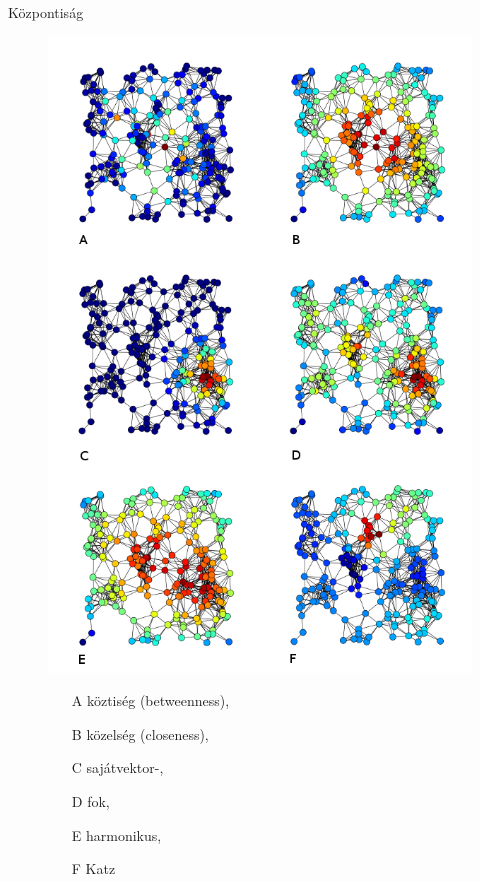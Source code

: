 \documentclass{beamer}
\newlength{\onecolwid}
\begin{document}
\begin{frame}[t]
\begin{columns}[t]
    \begin{column}{\onecolwid} %
      \begin{block}{Központiság}
        \begin{figure}
        \includegraphics{6_centrality_measures}
          \begin{itemize}
\item[A] köztiség (betweenness),
\item[B] közelség (closeness),
\item[C] sajátvektor-,
\item[D] fok,
\item[E] harmonikus,
\item[F] Katz
          \end{itemize}
        \end{figure}
      \end{block}



\end{column}
\end{columns}
\end{frame}
\end{document}
